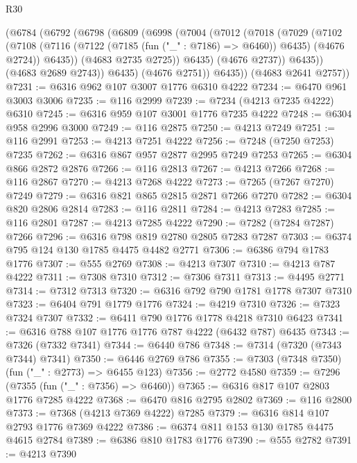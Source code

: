 \begin{lexlean}{R30}
\begin{coremodule}
        (@6784
          (@6792
            (@6798
              (@6809
                (@6998
                  (@7004
                    (@7012
                      (@7018
                        (@7029
                          (@7102
                            (@7108
                              (@7116
                                (@7122 (@7185 (fun ("_" : @7186) => @6460)) @6435)
                                (@4676 @2724))
                              @6435))
                          (@4683 @2735 @2725))
                        @6435)
                      (@4676 @2737))
                    @6435))
                (@4683 @2689 @2743))
              @6435)
            (@4676 @2751))
          @6435))
      (@4683 @2641 @2757))
@7231 := @6316 @962 @107 @3007 @1776 @6310 @4222
@7234 := @6470 @961 @3003 @3006
@7235 := @116 @2999
@7239 := @7234 (@4213 @7235 @4222) @6310
@7245 := @6316 @959 @107 @3001 @1776 @7235 @4222
@7248 := @6304 @958 @2996 @3000
@7249 := @116 @2875
@7250 := @4213 @7249
@7251 := @116 @2991
@7253 := @4213 @7251 @4222
@7256 := @7248 (@7250 @7253) @7235
@7262 := @6316 @867 @957 @2877 @2995 @7249 @7253
@7265 := @6304 @866 @2872 @2876
@7266 := @116 @2813
@7267 := @4213 @7266
@7268 := @116 @2867
@7270 := @4213 @7268 @4222
@7273 := @7265 (@7267 @7270) @7249
@7279 := @6316 @821 @865 @2815 @2871 @7266 @7270
@7282 := @6304 @820 @2806 @2814
@7283 := @116 @2811
@7284 := @4213 @7283
@7285 := @116 @2801
@7287 := @4213 @7285 @4222
@7290 := @7282 (@7284 @7287) @7266
@7296 := @6316 @798 @819 @2780 @2805 @7283 @7287
@7303 := @6374 @795 @124 @130 @1785 @4475 @4482 @2771
@7306 := @6386 @794 @1783 @1776
@7307 := @555 @2769
@7308 := @4213 @7307
@7310 := @4213 @787 @4222
@7311 := @7308 @7310
@7312 := @7306 @7311
@7313 := @4495 @2771
@7314 := @7312 @7313
@7320 := @6316 @792 @790 @1781 @1778 @7307 @7310
@7323 := @6404 @791 @1779 @1776
@7324 := @4219 @7310
@7326 := @7323 @7324 @7307
@7332 := @6411 @790 @1776 @1778 @4218 @7310 @6423
@7341 := @6316 @788 @107 @1776 @1776 @787 @4222 (@6432 @787) @6435
@7343 := @7326 (@7332 @7341)
@7344 := @6440 @786
@7348 := @7314 (@7320 (@7343 @7344) @7341)
@7350 := @6446 @2769 @786
@7355 := @7303 (@7348 @7350) (fun ("_" : @2773) => @6455 @123)
@7356 := @2772 @4580
@7359 := @7296 (@7355 (fun ("_" : @7356) => @6460))
@7365 := @6316 @817 @107 @2803 @1776 @7285 @4222
@7368 := @6470 @816 @2795 @2802
@7369 := @116 @2800
@7373 := @7368 (@4213 @7369 @4222) @7285
@7379 := @6316 @814 @107 @2793 @1776 @7369 @4222
@7386 := @6374 @811 @153 @130 @1785 @4475 @4615 @2784
@7389 := @6386 @810 @1783 @1776
@7390 := @555 @2782
@7391 := @4213 @7390

\end{coremodule}
\end{lexlean}
